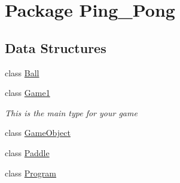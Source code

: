 \hypertarget{namespace_ping___pong}{\section{Package Ping\-\_\-\-Pong}
\label{namespace_ping___pong}
}
\subsection*{Data Structures}
\begin{DoxyCompactItemize}
\item 
class \hyperlink{class_ping___pong_1_1_ball}{Ball}
\item 
class \hyperlink{class_ping___pong_1_1_game1}{Game1}
\begin{DoxyCompactList}\small\item\em This is the main type for your game \end{DoxyCompactList}\item 
class \hyperlink{class_ping___pong_1_1_game_object}{Game\-Object}
\item 
class \hyperlink{class_ping___pong_1_1_paddle}{Paddle}
\item 
class \hyperlink{class_ping___pong_1_1_program}{Program}
\end{DoxyCompactItemize}
